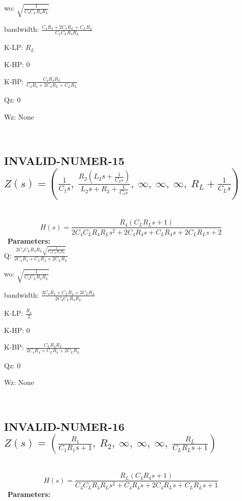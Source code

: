 \documentclass{article}
\begin{document}
wo: $\sqrt{\frac{1}{C_{4} C_{L} R_{4} R_{L}}}$\ 

bandwidth: $\frac{C_{4} R_{4} + 2 C_{4} R_{L} + C_{L} R_{L}}{C_{4} C_{L} R_{4} R_{L}}$\ 

K-LP: $R_{L}$\ 

K-HP: $0$\ 

K-BP: $\frac{C_{4} R_{4} R_{L}}{C_{4} R_{4} + 2 C_{4} R_{L} + C_{L} R_{L}}$\ 

Qz: $0$\ 

Wz: $\text{None}$\ 

\ 

\subsection{INVALID-NUMER-15 $Z(s) = \left( \frac{1}{C_{1} s}, \  \frac{R_{2} \left(L_{2} s + \frac{1}{C_{2} s}\right)}{L_{2} s + R_{2} + \frac{1}{C_{2} s}}, \  \infty, \  \infty, \  \infty, \  R_{L} + \frac{1}{C_{L} s}\right)$ } \ 
\textbf{\[H(s) = \frac{R_{4} \left(C_{L} R_{L} s + 1\right)}{2 C_{4} C_{L} R_{4} R_{L} s^{2} + 2 C_{4} R_{4} s + C_{L} R_{4} s + 2 C_{L} R_{L} s + 2}\] } \ 
\textbf{Parameters:}\\ 

Q: $\frac{2 C_{4} C_{L} R_{4} R_{L} \sqrt{\frac{1}{C_{4} C_{L} R_{4} R_{L}}}}{2 C_{4} R_{4} + C_{L} R_{4} + 2 C_{L} R_{L}}$\ 

wo: $\sqrt{\frac{1}{C_{4} C_{L} R_{4} R_{L}}}$\ 

bandwidth: $\frac{2 C_{4} R_{4} + C_{L} R_{4} + 2 C_{L} R_{L}}{2 C_{4} C_{L} R_{4} R_{L}}$\ 

K-LP: $\frac{R_{4}}{2}$\ 

K-HP: $0$\ 

K-BP: $\frac{C_{L} R_{4} R_{L}}{2 C_{4} R_{4} + C_{L} R_{4} + 2 C_{L} R_{L}}$\ 

Qz: $0$\ 

Wz: $\text{None}$\ 

\ 

\subsection{INVALID-NUMER-16 $Z(s) = \left( \frac{R_{1}}{C_{1} R_{1} s + 1}, \  R_{2}, \  \infty, \  \infty, \  \infty, \  \frac{R_{L}}{C_{L} R_{L} s + 1}\right)$ } \ 
\textbf{\[H(s) = \frac{R_{L} \left(C_{4} R_{4} s + 1\right)}{C_{4} C_{L} R_{4} R_{L} s^{2} + C_{4} R_{4} s + 2 C_{4} R_{L} s + C_{L} R_{L} s + 1}\] } \ 
\textbf{Parameters:}\\ 
\end{document}
